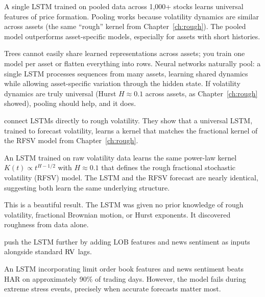 \begin{keyresult}
A single LSTM trained on pooled data across 1,000+ stocks learns universal features of price formation.
Pooling works because volatility dynamics are similar across assets (the same ``rough'' kernel from Chapter~\ref{ch:rough}).
The pooled model outperforms asset-specific models, especially for assets with short histories.
\end{keyresult}

\begin{keyidea}
Trees cannot easily share learned representations across assets; you train one model per asset or flatten everything into rows.
Neural networks naturally pool: a single LSTM processes sequences from many assets, learning shared dynamics while allowing asset-specific variation through the hidden state.
If volatility dynamics are truly universal (Hurst $H \approx 0.1$ across assets, as Chapter~\ref{ch:rough} showed), pooling should help, and it does.
\end{keyidea}

\citet{RosenbaumZhang2022} connect LSTMs directly to rough volatility.
They show that a universal LSTM, trained to forecast volatility, learns a kernel that matches the fractional kernel of the RFSV model from Chapter~\ref{ch:rough}.

\begin{keyresult}
An LSTM trained on raw volatility data learns the same power-law kernel $K(t) \propto t^{H-1/2}$ with $H \approx 0.1$ that defines the rough fractional stochastic volatility (RFSV) model.
The LSTM and the RFSV forecast are nearly identical, suggesting both learn the same underlying structure.
\end{keyresult}

This is a beautiful result. The LSTM was given no prior knowledge of rough volatility, fractional Brownian motion, or Hurst exponents. It discovered roughness from data alone.

\citet{RahimikiaPoon2020} push the LSTM further by adding LOB features and news sentiment as inputs alongside standard $\operatorname{RV}$ lags.

\begin{keyresult}
An LSTM incorporating limit order book features and news sentiment beats HAR on approximately 90\% of trading days.
However, the model fails during extreme stress events, precisely when accurate forecasts matter most.
\end{keyresult}

